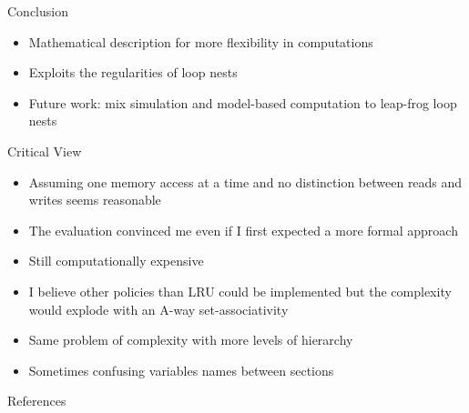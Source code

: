\documentclass{beamer}
\begin{document}
\begin{frame}{Conclusion}
  \begin{itemize}
    \item Mathematical description for more flexibility in computations
    \item Exploits the regularities of loop nests
    \item Future work: mix simulation and model-based computation to leap-frog loop nests
  \end{itemize}
\end{frame}

\begin{frame}{Critical View}
  \begin{itemize}[<+->]
    \item Assuming one memory access at a time and no distinction between reads and writes seems reasonable
    \item The evaluation convinced me even if I first expected a more formal approach
    \item Still computationally expensive
    \item I believe other policies than LRU could be implemented but the complexity would explode with an A-way set-associativity
    \item Same problem of complexity with more levels of hierarchy
    \item Sometimes confusing variables names between sections
  \end{itemize}
\end{frame}

\appendix

\begin{frame}[allowframebreaks]{References}
  
  
\end{frame}
\end{document}
